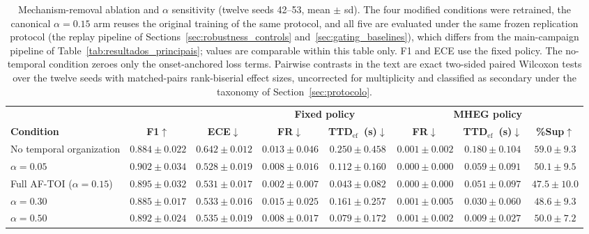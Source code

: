 \documentclass[a4paper,fleqn]{cas-dc}
\newcommand{\MHEG}{\mbox{MHEG}\xspace}
\begin{document}
\begin{table}[!tbp]
\color{\revcolor}
\centering
\caption{Mechanism-removal ablation and $\alpha$ sensitivity (twelve seeds
42--53, mean $\pm$ sd). The four modified conditions were retrained, the
canonical $\alpha{=}0.15$ arm reuses the original training of the same
protocol, and all five are evaluated
under the same frozen replication protocol (the replay pipeline of
Sections~\ref{sec:robustness_controls}
and~\ref{sec:gating_baselines}), which differs from the main-campaign
pipeline of Table~\ref{tab:resultados_principais}; values are comparable
within this table only. F1 and ECE use the fixed policy. The no-temporal condition zeroes only the
onset-anchored loss terms. Pairwise contrasts in the text are exact two-sided
paired Wilcoxon tests over the twelve seeds with matched-pairs rank-biserial
effect sizes, uncorrected for multiplicity and classified as secondary under
the taxonomy of Section~\ref{sec:protocolo}.}
\label{tab:ablacao_alpha}
\footnotesize
\setlength{\tabcolsep}{5pt}
\renewcommand{\arraystretch}{1.2}
\begin{tabular}{l c c cc ccc}
\toprule
& & & \multicolumn{2}{c}{\textbf{Fixed policy}}
  & \multicolumn{3}{c}{\textbf{\MHEG policy}} \\
\cmidrule(lr){4-5}\cmidrule(lr){6-8}
\textbf{Condition} & \textbf{F1}$\uparrow$ & \textbf{ECE}$\downarrow$
  & \textbf{FR}$\downarrow$ & \textbf{TTD$_{\mathrm{ef}}$~(s)}$\downarrow$
  & \textbf{FR}$\downarrow$ & \textbf{TTD$_{\mathrm{ef}}$~(s)}$\downarrow$
  & \textbf{\%Sup}$\uparrow$ \\
\midrule
No temporal organization & $0.884 \pm 0.022$ & $0.642 \pm 0.012$
  & $0.013 \pm 0.046$ & $0.250 \pm 0.458$
  & $0.001 \pm 0.002$ & $0.180 \pm 0.104$ & $59.0 \pm 9.3$ \\
$\alpha=0.05$ & $0.902 \pm 0.034$ & $0.528 \pm 0.019$
  & $0.008 \pm 0.016$ & $0.112 \pm 0.160$
  & $0.000 \pm 0.000$ & $0.059 \pm 0.091$ & $50.1 \pm 9.5$ \\
\rowcolor{gray!8}
Full \mbox{AF-TOI} ($\alpha=0.15$) & $0.895 \pm 0.032$ & $0.531 \pm 0.017$
  & $0.002 \pm 0.007$ & $\mathbf{0.043 \pm 0.082}$
  & $0.000 \pm 0.000$ & $0.051 \pm 0.097$ & $47.5 \pm 10.0$ \\
$\alpha=0.30$ & $0.885 \pm 0.017$ & $0.533 \pm 0.016$
  & $0.015 \pm 0.025$ & $0.161 \pm 0.257$
  & $0.001 \pm 0.005$ & $0.030 \pm 0.060$ & $48.6 \pm 9.3$ \\
$\alpha=0.50$ & $0.892 \pm 0.024$ & $0.535 \pm 0.019$
  & $0.008 \pm 0.017$ & $0.079 \pm 0.172$
  & $0.001 \pm 0.002$ & $0.009 \pm 0.027$ & $50.0 \pm 7.2$ \\
\bottomrule
\end{tabular}
\end{table}
\end{document}
